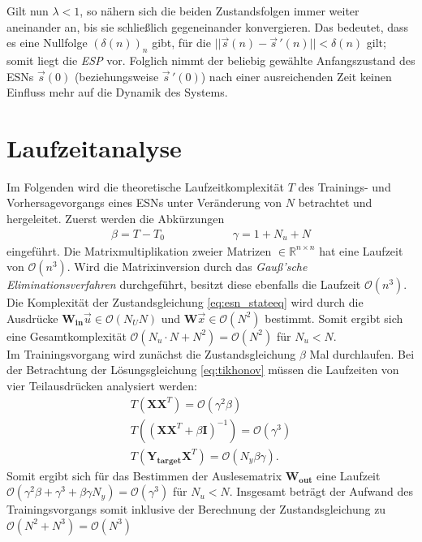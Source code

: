 \begin{appendices}
Gilt nun $\lambda < 1$, so nähern sich die beiden Zustandsfolgen immer weiter aneinander an, bis sie schließlich gegeneinander konvergieren. Das bedeutet, dass es eine Nullfolge $(\delta(n))_n$ gibt, für die $||\vec{s}(n) - \vec{s}\,'(n)|| < \delta(n)$ gilt; somit liegt die \textit{ESP} vor. Folglich nimmt der beliebig gewählte Anfangszustand des \textsc{ESN}s $\vec{s}(0)$ (beziehungsweise $\vec{s}\,'(0)$) nach einer ausreichenden Zeit keinen Einfluss mehr auf die Dynamik des Systems.

\section{Laufzeitanalyse}
\label{sc:apx_runtime_complexity}
Im Folgenden wird die theoretische Laufzeitkomplexität $T$ des Trainings- und Vorhersagevorgangs eines \textsc{ESN}s unter Veränderung von $N$ betrachtet und hergeleitet.
Zuerst werden die Abkürzungen
\begin{align*}
\beta = T-T_{0} \qquad\qquad\qquad \gamma = 1+N_u+N
\end{align*}
eingeführt. Die Matrixmultiplikation zweier Matrizen $\in \mathbb{R}^{n \times n}$ hat eine Laufzeit von $\mathcal{O}(n^3)$. Wird die Matrixinversion durch das \textit{Gauß'sche Eliminationsverfahren} durchgeführt, besitzt diese ebenfalls die Laufzeit $\mathcal{O}(n^3)$.\\
Die Komplexität der Zustandsgleichung \ref{eq:esn_stateeq} wird durch die Ausdrücke $\mathbf{W_{in}} \vec{u} \in \mathcal{O}(N_U N)$ und $\mathbf{W}\vec{x} \in \mathcal{O}(N^2)$ bestimmt. Somit ergibt sich eine Gesamtkomplexität $\mathcal{O}(N_u \cdot N + N^2) = \mathcal{O}(N^2)$ für $N_u < N$.\\

Im Trainingsvorgang wird zunächst die Zustandsgleichung $\beta$ Mal durchlaufen. Bei der Betrachtung der Lösungsgleichung \ref{eq:tikhonov} müssen die Laufzeiten von vier Teilausdrücken analysiert werden:
\begin{align*}
T\left(\mathbf{X}\mathbf{X}^T \right) = \mathcal{O}(\gamma^2 \beta) \\
T\left((\mathbf{X}\mathbf{X}^T+\beta \mathbf{I})^{-1} \right) = \mathcal{O}(\gamma^{3}) \\
T\left(\mathbf{Y_{target}}\mathbf{X}^T \right) = \mathcal{O}(N_y \beta \gamma).
\end{align*}
Somit ergibt sich für das Bestimmen der Auslesematrix $\mathbf{W_{out}}$ eine Laufzeit $\mathcal{O}(\gamma^2 \beta + \gamma^{3} + \beta \gamma N_y) = \mathcal{O}(\gamma^{3})$  für $N_u < N$.
Insgesamt beträgt der Aufwand des Trainingsvorgangs somit inklusive der Berechnung der Zustandsgleichung zu $\mathcal{O}(N^2 + N^{3}) = \mathcal{O}(N^{3})$\\


\end{appendices}
